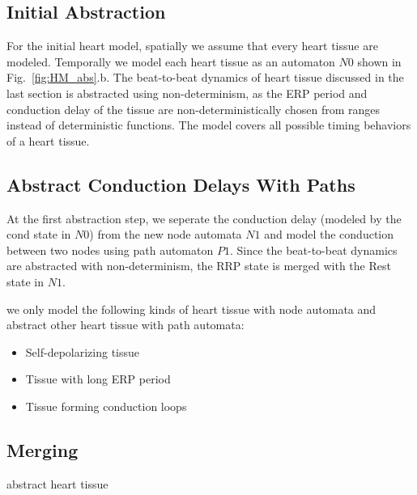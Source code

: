 \documentclass[openany]{now} %
\newcommand{\figref}[1]{Fig.~\ref{fig:#1}}
\begin{document}
\subsection{Initial Abstraction}
For the initial heart model, spatially we assume that every heart tissue are modeled. Temporally we model each heart tissue as an automaton $N0$ shown in \figref{HM_abs}.b. The beat-to-beat dynamics of heart tissue discussed in the last section is abstracted using non-determinism, as the ERP period and conduction delay of the tissue are non-deterministically chosen from ranges instead of deterministic functions. The model covers all possible timing behaviors of a heart tissue. 

\subsection{Abstract Conduction Delays With Paths}
At the first abstraction step, we seperate the conduction delay (modeled by the cond state in $N0$) from the new node automata $N1$ and model the conduction between two nodes using path automaton $P1$. Since the beat-to-beat dynamics are abstracted with non-determinism, the RRP state is merged with the Rest state in $N1$. 

we only model the following kinds of heart tissue with node automata and abstract other heart tissue with path automata:
\begin{itemize}
	\item Self-depolarizing tissue
    \item Tissue with long ERP period
    \item Tissue forming conduction loops
\end{itemize}

\subsection{Merging}
abstract heart tissue
\end{document}
